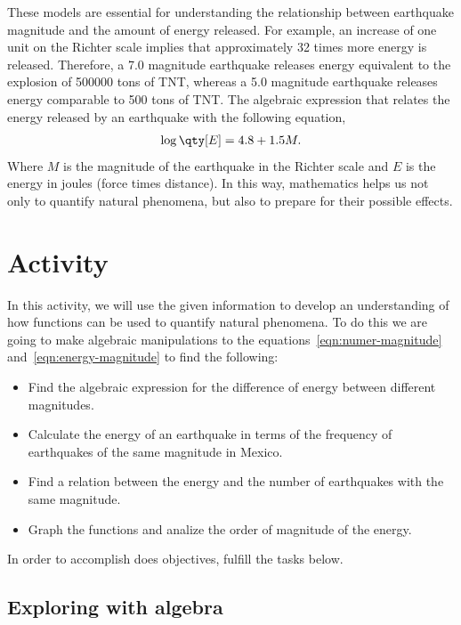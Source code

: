 \documentclass[../main.tex]{subfiles}
\begin{document}
These models are essential for understanding the relationship between earthquake magnitude and the amount of energy released. 
For example, an increase of one unit on the Richter scale implies that approximately 32 times more energy is released. 
Therefore, a \num{7.0} magnitude earthquake releases energy equivalent to the explosion of \num{500 000} tons of TNT, whereas a \num{5.0} magnitude earthquake releases energy comparable to \num{500} tons of TNT.
The algebraic expression that relates the energy released by an earthquake with the following equation,
\begin{gather}
    \log\qty[E] = 4.8 + 1.5 M.\label{eqn:energy-magnitude}
\end{gather}
Where $M$ is the magnitude of the earthquake in the Richter scale and $E$ is the energy in joules (force times distance).
In this way, mathematics helps us not only to quantify natural phenomena, but also to prepare for their possible effects.

\section{Activity}

In this activity, we will use the given information to develop an understanding of how functions can be used to quantify natural phenomena.
To do this we are going to make algebraic manipulations to the equations~\eqref{eqn:numer-magnitude} and~\eqref{eqn:energy-magnitude} to find the following:
\begin{itemize}
    \item Find the algebraic expression for the difference of energy between different magnitudes.
\item Calculate the energy of an earthquake in terms of the frequency of earthquakes of the same magnitude in Mexico.
    \item Find a relation between the energy and the number of earthquakes with the same magnitude.
    \item Graph the functions and analize the order of magnitude of the energy.
\end{itemize}
In order to accomplish does objectives, fulfill the tasks below.

\subsection{Exploring with algebra}
\end{document}
